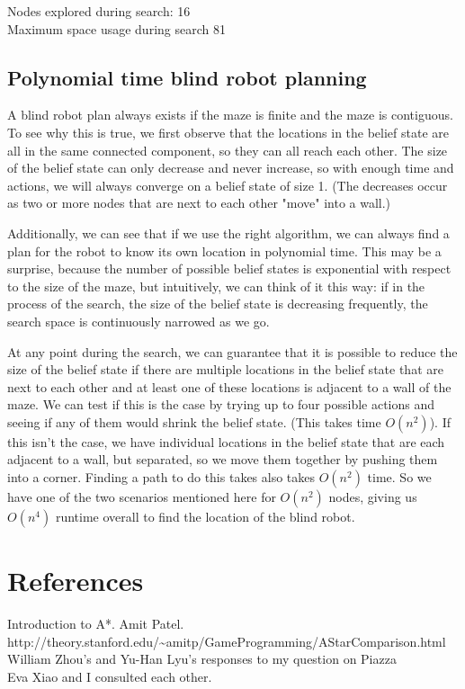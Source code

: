 \documentclass{article}
\begin{document}
{\setlength{\parindent}{0cm}
Nodes explored during search:  16\\
Maximum space usage during search 81\\
}

\subsection{Polynomial time blind robot planning}
A blind robot plan always exists if the maze is finite and the maze is contiguous. To see why this is true, we first observe that the locations in the belief state are all in the same connected component, so they can all reach each other. The size of the belief state can only decrease and never increase, so with enough time and actions, we will always converge on a belief state of size 1. (The decreases occur as two or more nodes that are next to each other "move" into a wall.)

Additionally, we can see that if we use the right algorithm, we can always find a plan for the robot to know its own location in polynomial time. This may be a surprise, because the number of possible belief states is exponential with respect to the size of the maze, but intuitively, we can think of it this way: if in the process of the search, the size of the belief state is decreasing frequently, the search space is continuously narrowed as we go. 

At any point during the search, we can guarantee that it is possible to reduce the size of the belief state if there are multiple locations in the belief state that are next to each other and at least one of these locations is adjacent to a wall of the maze. We can test if this is the case by trying up to four possible actions and seeing if any of them would shrink the belief state. (This takes time $O(n^2)$). If this isn't the case, we have individual locations in the belief state that are each adjacent to a wall, but separated, so we move them together by pushing them into a corner. Finding a path to do this takes also takes $O(n^2)$ time. So we have one of the two scenarios mentioned here for $O(n^2)$ nodes, giving us $O(n^4)$ runtime overall to find the location of the blind robot.


\section{References}

Introduction to A*. Amit Patel. http://theory.stanford.edu/\textasciitilde amitp/GameProgramming/AStarComparison.html\\
William Zhou's and Yu-Han Lyu's responses to my question on Piazza\\
Eva Xiao and I consulted each other.
\end{document}
